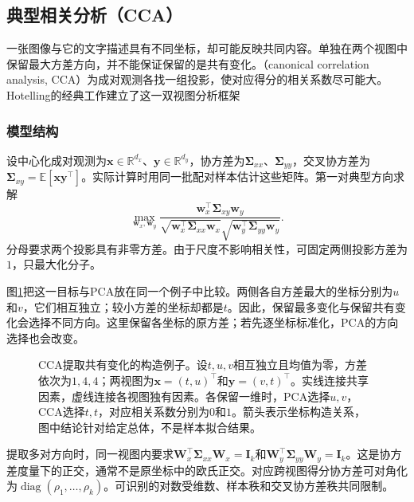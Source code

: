 \subsection{典型相关分析（CCA）}
\label{sec:dim-cca}

一张图像与它的文字描述具有不同坐标，却可能反映共同内容。单独在两个视图中保留最大方差方向，并不能保证保留的是共有变化。（canonical correlation analysis, CCA）为成对观测各找一组投影，使对应得分的相关系数尽可能大。Hotelling的经典工作建立了这一双视图分析框架

\subsubsection{模型结构}
\label{sec:dim-cca-structure}

设中心化成对观测为$\bm{x}\in\mathbb{R}^{d_x}$、$\bm{y}\in\mathbb{R}^{d_y}$，协方差为$\bm{\Sigma}_{xx}$、$\bm{\Sigma}_{yy}$，交叉协方差为$\bm{\Sigma}_{xy}=\mathbb{E}[\bm{x}\bm{y}^{\top}]$。实际计算时用同一批配对样本估计这些矩阵。第一对典型方向求解
\begin{equation}
  \max_{\bm{w}_x,\bm{w}_y}
  \frac{\bm{w}_x^{\top}\bm{\Sigma}_{xy}\bm{w}_y}
  {\sqrt{\bm{w}_x^{\top}\bm{\Sigma}_{xx}\bm{w}_x}
   \sqrt{\bm{w}_y^{\top}\bm{\Sigma}_{yy}\bm{w}_y}}.
  \label{eq:dim-cca-correlation}
\end{equation}
分母要求两个投影具有非零方差。由于尺度不影响相关性，可固定两侧投影方差为$1$，只最大化分子。

图\ref{fig:dim-cca-shared}把这一目标与PCA放在同一个例子中比较。两侧各自方差最大的坐标分别为$u$和$v$，它们相互独立；较小方差的坐标却都是$t$。因此，保留最多变化与保留共有变化会选择不同方向。这里保留各坐标的原方差；若先逐坐标标准化，PCA的方向选择也会改变。

\begin{figure}[!ht]
  \centering
  
  \caption{CCA提取共有变化的构造例子。设$t,u,v$相互独立且均值为零，方差依次为$1,4,4$；两视图为$\bm{x}=(t,u)^\top$和$\bm{y}=(v,t)^\top$。实线连接共享因素，虚线连接各视图独有因素。各保留一维时，PCA选择$u,v$，CCA选择$t,t$，对应相关系数分别为$0$和$1$。箭头表示坐标构造关系，图中结论针对给定总体，不是样本拟合结果。}
  \label{fig:dim-cca-shared}
\end{figure}

提取多对方向时，同一视图内要求$\bm{W}_x^{\top}\bm{\Sigma}_{xx}\bm{W}_x=\bm{I}_k$和$\bm{W}_y^{\top}\bm{\Sigma}_{yy}\bm{W}_y=\bm{I}_k$。这是协方差度量下的正交，通常不是原坐标中的欧氏正交。对应跨视图得分协方差可对角化为$\operatorname{diag}(\rho_1,\ldots,\rho_k)$。可识别的对数受维数、样本秩和交叉协方差秩共同限制。

